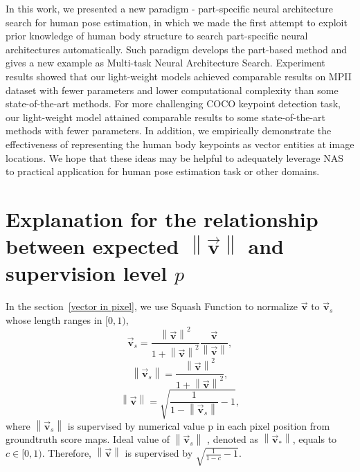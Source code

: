 \documentclass[journal]{IEEEtran}
\begin{document}
In this work, we presented a new paradigm - part-specific neural architecture search for human pose estimation, in which we made the first attempt to exploit prior knowledge of human body structure to search part-specific neural architectures automatically. Such paradigm develops the part-based method and gives a new example as Multi-task Neural Architecture Search. Experiment results showed that our light-weight models achieved comparable results on MPII dataset with fewer parameters and lower computational complexity than some state-of-the-art methods. For more challenging COCO keypoint detection task, our light-weight model attained comparable results to some state-of-the-art methods with fewer parameters. In addition, we empirically demonstrate the effectiveness of representing the human body keypoints as vector entities at image locations.  We hope that these ideas may be helpful to adequately leverage NAS to practical application for human pose estimation task or other domains.

\ifCLASSOPTIONcaptionsoff
  \newpage
\fi


 


	

\appendices

\section{Explanation for the relationship between expected $\left\|\vec{\mathbf{v}}\right\|$ and supervision level $p$}
\label{appendix}
In the section~\ref{vector in pixel}, we use Squash Function to normalize $\vec{\mathbf{v}}$ to $\vec{\mathbf{v}}_s$ whose length ranges in $[0, 1)$,
\begin{equation}
\vec{\mathbf{v}}_s=\frac{\left\|\vec{\mathbf{v}}\right\|^{2}}{1+\left\|\vec{\mathbf{v}}\right\|^{2}} \frac{\vec{\mathbf{v}}}{\left\|\vec{\mathbf{v}}\right\|},
\end{equation}
\begin{equation}
\left\|\vec{\mathbf{v}}_s\right\|=\frac{\left\|\vec{\mathbf{v}}\right\|^{2}}{1+\left\|\vec{\mathbf{v}}\right\|^{2}},
\end{equation}
\begin{equation}
\left\|\vec{\mathbf{v}}\right\|=\sqrt{\frac{1}{1-\left\|\vec{\mathbf{v}}_s\right\|}-1},
\end{equation}
where $\left\|\vec{\mathbf{v}}_s\right\|$ is supervised by numerical value p in each pixel position from groundtruth score maps. Ideal value of $\left\|\vec{\mathbf{v}}_s\right\|$  , denoted as $\left\| \vec{\mathbf{v}}_*\right\|$, equals to $c\in [0, 1)$. Therefore, $\left\|\vec{\mathbf{v}}\right\|$ is supervised by $\sqrt{\frac{1}{1-c}-1}$. 
\end{document}
